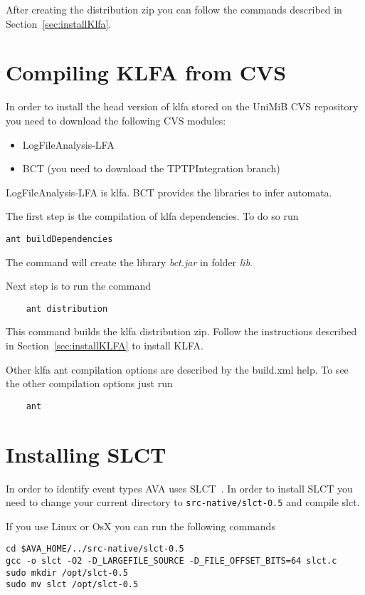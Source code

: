 After creating the distribution zip you can follow the commands described in
Section~\ref{sec:installKlfa}.

\section{Compiling KLFA from CVS}
\label{sec:compileklfaCVS}

In order to install the head version of klfa stored on the UniMiB CVS repository
you need to download the following CVS modules:
\begin{itemize}
  \item LogFileAnalysis-LFA
  \item BCT (you need to download the TPTPIntegration branch)
\end{itemize}

LogFileAnalysis-LFA is klfa. BCT
provides the libraries to infer automata.

The first step is the compilation of klfa dependencies. To do so run
\begin{verbatim}
ant buildDependencies
\end{verbatim}

The command will create the library \textit{bct.jar} in
folder \textit{lib}.

Next step is to run the command

\begin{verbatim}
	ant distribution
\end{verbatim}	

This command builds the klfa distribution zip. Follow the instructions described
in Section~\ref{sec:installKLFA} to install KLFA.

Other klfa ant compilation options are described by the build.xml help. To see
the other compilation options just run
\begin{verbatim}
	ant
\end{verbatim}



\section{Installing SLCT}
\label{sec:installSLCT}

In order to identify event types AVA uses SLCT~\cite{VaarandiIPOM2003}. In order to install SLCT
you need to change your current directory to \texttt{src-native/slct-0.5} and
compile slct.

If you use Linux or OsX you can run the following commands

\begin{verbatim}
cd $AVA_HOME/../src-native/slct-0.5
gcc -o slct -O2 -D_LARGEFILE_SOURCE -D_FILE_OFFSET_BITS=64 slct.c
sudo mkdir /opt/slct-0.5
sudo mv slct /opt/slct-0.5
\end{verbatim}
